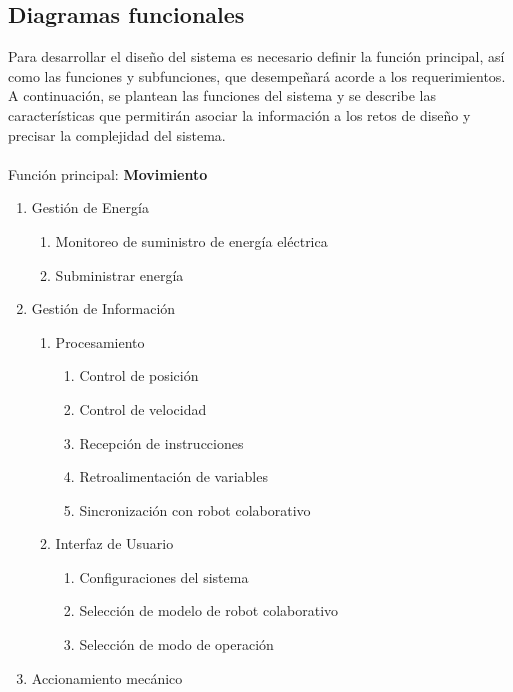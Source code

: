 \subsection{Diagramas funcionales}
Para desarrollar el diseño del sistema es necesario definir la función principal, así como las funciones y subfunciones, que desempeñará acorde a los requerimientos. A continuación, se plantean las funciones del sistema y se describe las características que permitirán asociar la información a los retos de diseño y precisar la complejidad del sistema.\\
\\
Función principal: \textbf{Movimiento}
\begin{enumerate}
    \item Gestión de Energía
    \begin{enumerate}[label*=\arabic*.]
        \item Monitoreo de suministro de energía eléctrica
        \item Subministrar energía
    \end{enumerate}
    \item Gestión de Información
        \begin{enumerate}[label*=\arabic*.]
        \item Procesamiento
            \begin{enumerate}[label*=\arabic*.]
            \item Control de posición
            \item Control de velocidad
            \item Recepción de instrucciones
            \item Retroalimentación de variables
            \item Sincronización con robot colaborativo
            \end{enumerate}
        \item Interfaz de Usuario
            \begin{enumerate}[label*=\arabic*.]
            \item Configuraciones del sistema
            \item Selección de modelo de robot colaborativo
            \item Selección de modo de operación
            \end{enumerate}
        \end{enumerate}
    \item Accionamiento mecánico
    \begin{enumerate}[label*=\arabic*.]

\end{enumerate}
\end{enumerate}
